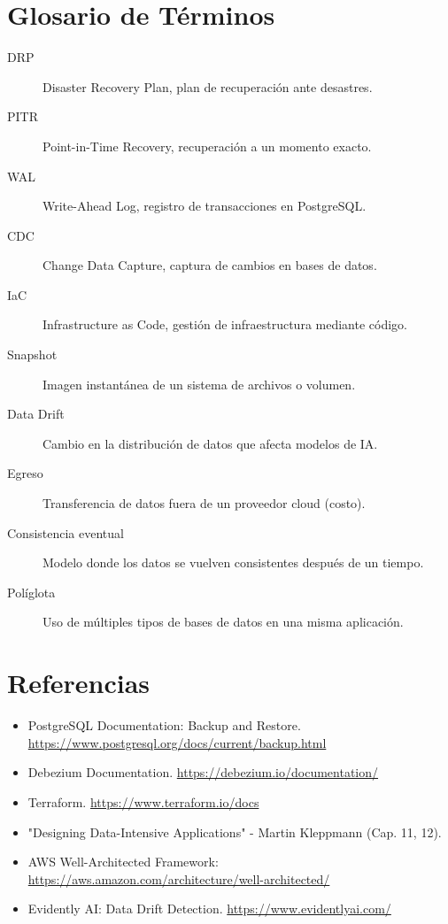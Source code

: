 \documentclass[12pt,a4paper,openany,oneside]{book}
\begin{document}
\chapter{Glosario de Términos}
\begin{description}
    \item[DRP] Disaster Recovery Plan, plan de recuperación ante desastres.
    \item[PITR] Point-in-Time Recovery, recuperación a un momento exacto.
    \item[WAL] Write-Ahead Log, registro de transacciones en PostgreSQL.
    \item[CDC] Change Data Capture, captura de cambios en bases de datos.
    \item[IaC] Infrastructure as Code, gestión de infraestructura mediante código.
    \item[Snapshot] Imagen instantánea de un sistema de archivos o volumen.
    \item[Data Drift] Cambio en la distribución de datos que afecta modelos de IA.
    \item[Egreso] Transferencia de datos fuera de un proveedor cloud (costo).
    \item[Consistencia eventual] Modelo donde los datos se vuelven consistentes después de un tiempo.
    \item[Políglota] Uso de múltiples tipos de bases de datos en una misma aplicación.
\end{description}

\chapter*{Referencias}
\begin{itemize}
    \item PostgreSQL Documentation: Backup and Restore. \url{https://www.postgresql.org/docs/current/backup.html}
    \item Debezium Documentation. \url{https://debezium.io/documentation/}
    \item Terraform. \url{https://www.terraform.io/docs}
    \item "Designing Data-Intensive Applications" - Martin Kleppmann (Cap. 11, 12).
    \item AWS Well-Architected Framework: \url{https://aws.amazon.com/architecture/well-architected/}
    \item Evidently AI: Data Drift Detection. \url{https://www.evidentlyai.com/}
\end{itemize}
\end{document}
